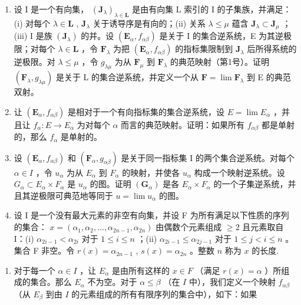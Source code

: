 \exercisegroup

\begin{enumerate}
\def\labelenumi{\arabic{enumi}.}
\item
  设 I 是一个有向集， \((\mathbf{J}_{\lambda})_{\lambda \in \mathbf{L}}\) 是由有向集 L 索引的 I 的子集族，并满足：(i) 对每个 \(\lambda \in \mathbf{L}\) , \(\mathbf{J}_{\lambda}\) 关于诱导序是有向的；(ii) 关系 \(\lambda \leqslant \mu\) 蕴含 \(\mathbf{J}_{\lambda} \subset \mathbf{J}_{\mu}\) ；(iii) I 是族 \((\mathbf{J}_{\lambda})\) 的并。设 \((\mathbf{E}_{\alpha}, f_{\alpha\beta})\) 是关于 I 的集合逆系统，E 为其逆极限；对每个 \(\lambda \in \mathbf{L}\) ，令 \(\mathbf{F}_{\lambda}\) 为把 \((\mathbf{E}_{\alpha}, f_{\alpha\beta})\) 的指标集限制到 \(\mathbf{J}_{\lambda}\) 后所得系统的逆极限。对 \(\lambda \leqslant \mu\) ，令 \(g_{\lambda \mu}\) 为从 \(\mathbf{F}_{\mu}\) 到 \(\mathbf{F}_{\lambda}\) 的典范映射（第1号）。证明 \((\mathbf{F}_{\lambda}, g_{\lambda \mu})\) 是关于 L 的集合逆系统，并定义一个从 \(\mathbf{F} = \lim \mathbf{F}_{\lambda}\) 到 E 的典范双射。
\item
  让 \((\mathbf{E}_{\alpha}, f_{\alpha\beta})\) 是相对于一个有向指标集的集合逆系统，设 \(E = \lim E_{\alpha}\) ，并且让 \(f_{\alpha}: E \to E_{\alpha}\) 为对每个 \(\alpha\) 而言的典范映射。证明：如果所有 \(f_{\alpha\beta}\) 都是单射的，那么 \(f_{\alpha}\) 是单射的。
\item
  设 \((\mathbf{E}_{\alpha}, f_{\alpha\beta})\) 和 \((\mathbf{F}_{\alpha}, g_{\alpha\beta})\) 是关于同一指标集 I 的两个集合逆系统。对每个 \(\alpha \in I\) ，令 \(u_{\alpha}\) 为从 \(E_{\alpha}\) 到 \(F_{\alpha}\) 的映射，并使各 \(u_{\alpha}\) 构成一个映射逆系统。设 \(G_{\alpha} \subset E_{\alpha} \times F_{\alpha}\) 是 \(u_{\alpha}\) 的图。证明 \((\mathbf{G}_{\alpha})\) 是各 \(E_{\alpha} \times F_{\alpha}\) 的一个子集逆系统，并且其逆极限可典范地等同于 \(u = \lim u_{\alpha}\) 的图。
\item
  设 I 是一个没有最大元素的非空有向集，并设 F 为所有满足以下性质的序列的集合： \(x = (\alpha_1, \alpha_2, \ldots, \alpha_{2n-1}, \alpha_{2n})\) 由偶数个元素组成 \(\geqslant 2\) 且元素取自 I：(i) \(\alpha_{2i-1} < \alpha_{2i}\) 对于 \(1 \leqslant i \leqslant n\) ；(ii) \(\alpha_{2i-1} \leqslant \alpha_{2j-1}\) 对于 \(1 \leqslant j < i \leqslant n\) 。集合 F 非空。令 \(r(x) = \alpha_{2n-1}\) , \(s(x) = \alpha_{2n}\) 。整数 \(n\) 称为 \(x\) 的长度.
\end{enumerate}

\begin{enumerate}
\def\labelenumi{(\alph{enumi})}
\tightlist
\item
  对于每一个 \(\alpha \in I\) ，让 \(E_{\alpha}\) 是由所有这样的 \(x \in F\) （满足 \(r(x) = \alpha\) ）所组成的集合。那么 \(E_{\alpha}\) 不为空。对于 \(\alpha \leqslant \beta\) （在 \(I\) 中），我们定义一个映射 \(f_{\alpha \beta}\) （从 \(E_{\beta}\) 到由 \(I\) 的元素组成的所有有限序列的集合中），如下：如果
\end{enumerate}

